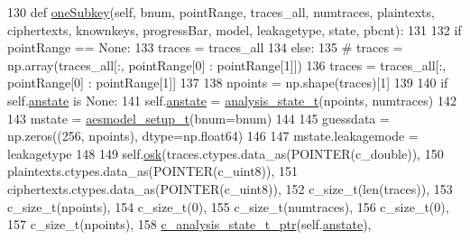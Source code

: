 \begin{DoxyCode}
130     \textcolor{keyword}{def }\hyperlink{classsoftware_1_1chipwhisperer_1_1analyzer_1_1attacks_1_1cpa__algorithms_1_1progressive__caccel_1_1CPAProgressiveOneSubkey_ad88b51e42fb1d061437ade35b957699a}{oneSubkey}(self, bnum, pointRange, traces\_all, numtraces, plaintexts, ciphertexts, 
      knownkeys, progressBar, model, leakagetype, state, pbcnt):
131 
132         \textcolor{keywordflow}{if} pointRange == \textcolor{keywordtype}{None}:
133             traces = traces\_all
134         \textcolor{keywordflow}{else}:
135             \textcolor{comment}{# traces = np.array(traces\_all[:, pointRange[0] : pointRange[1]])}
136             traces = traces\_all[:, pointRange[0] : pointRange[1]]
137 
138         npoints = np.shape(traces)[1]
139 
140         \textcolor{keywordflow}{if} self.\hyperlink{classsoftware_1_1chipwhisperer_1_1analyzer_1_1attacks_1_1cpa__algorithms_1_1progressive__caccel_1_1CPAProgressiveOneSubkey_abc94b14ea5f680c42544cc571fa392ae}{anstate} \textcolor{keywordflow}{is} \textcolor{keywordtype}{None}:
141             self.\hyperlink{classsoftware_1_1chipwhisperer_1_1analyzer_1_1attacks_1_1cpa__algorithms_1_1progressive__caccel_1_1CPAProgressiveOneSubkey_abc94b14ea5f680c42544cc571fa392ae}{anstate} = \hyperlink{classsoftware_1_1chipwhisperer_1_1analyzer_1_1attacks_1_1cpa__algorithms_1_1progressive__caccel_1_1analysis__state__t}{analysis\_state\_t}(npoints, numtraces)
142             
143         mstate = \hyperlink{classsoftware_1_1chipwhisperer_1_1analyzer_1_1attacks_1_1cpa__algorithms_1_1progressive__caccel_1_1aesmodel__setup__t}{aesmodel\_setup\_t}(bnum=bnum)
144         
145         guessdata = np.zeros((256, npoints), dtype=np.float64)
146 
147         mstate.leakagemode = leakagetype
148 
149         self.\hyperlink{classsoftware_1_1chipwhisperer_1_1analyzer_1_1attacks_1_1cpa__algorithms_1_1progressive__caccel_1_1CPAProgressiveOneSubkey_a76d4f5791241c0a5c7b7dda5fc0da0d8}{osk}(traces.ctypes.data\_as(POINTER(c\_double)),
150                  plaintexts.ctypes.data\_as(POINTER(c\_uint8)),
151                  ciphertexts.ctypes.data\_as(POINTER(c\_uint8)),
152                  c\_size\_t(len(traces)),
153                  c\_size\_t(npoints),
154                  c\_size\_t(0),
155                  c\_size\_t(numtraces),
156                  c\_size\_t(0),
157                  c\_size\_t(npoints),
158                  \hyperlink{namespacesoftware_1_1chipwhisperer_1_1analyzer_1_1attacks_1_1cpa__algorithms_1_1progressive__caccel_aabd08257306b5406199bb1f33e87122e}{c\_analysis\_state\_t\_ptr}(self.\hyperlink{classsoftware_1_1chipwhisperer_1_1analyzer_1_1attacks_1_1cpa__algorithms_1_1progressive__caccel_1_1CPAProgressiveOneSubkey_abc94b14ea5f680c42544cc571fa392ae}{anstate}),

\end{DoxyCode}
